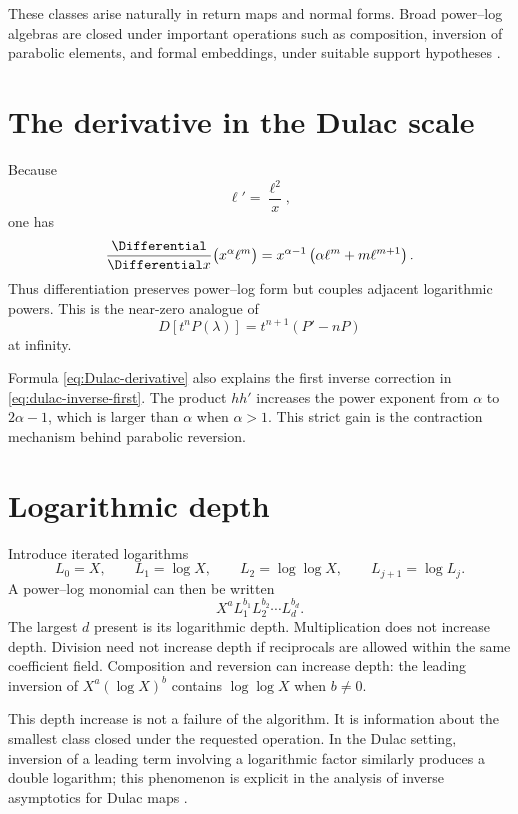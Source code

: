 \documentclass[11pt,openany]{book}
\theoremstyle{definition}
\theoremstyle{plain}
\theoremstyle{remark}
\begin{document}
These classes arise naturally in return maps and normal forms. Broad power--log algebras are closed under important operations such as composition, inversion of parabolic elements, and formal embeddings, under suitable support hypotheses \cite{mardesic-normalforms,mardesic-length,resman-dulac,peran-logtransseries}.

\section{The derivative in the Dulac scale}
Because
\[
 \ell'=\frac{\ell^2}{x},
\]
one has
\begin{equation}\label{eq:Dulac-derivative}
 \frac{\Differential}{\Differential x}\bigl(x^\alpha\ell^m\bigr)
 =x^{\alpha-1}\left(\alpha\ell^m+m\ell^{m+1}\right).
\end{equation}
Thus differentiation preserves power--log form but couples adjacent logarithmic powers. This is the near-zero analogue of
\[
 D[t^nP(\lambda)]=t^{n+1}(P'-nP)
\]
at infinity.

Formula \cref{eq:Dulac-derivative} also explains the first inverse correction in \cref{eq:dulac-inverse-first}. The product \(hh'\) increases the power exponent from \(\alpha\) to \(2\alpha-1\), which is larger than \(\alpha\) when \(\alpha>1\). This strict gain is the contraction mechanism behind parabolic reversion.

\section{Logarithmic depth}
Introduce iterated logarithms
\[
 L_0=X,
 \qquad L_1=\log X,
 \qquad L_2=\log\log X,
 \qquad L_{j+1}=\log L_j.
\]
A power--log monomial can then be written
\begin{equation}\label{eq:iterated-log-monomial}
 X^aL_1^{b_1}L_2^{b_2}\cdots L_d^{b_d}.
\end{equation}
The largest \(d\) present is its logarithmic depth. Multiplication does not increase depth. Division need not increase depth if reciprocals are allowed within the same coefficient field. Composition and reversion can increase depth: the leading inversion of \(X^a(\log X)^b\) contains \(\log\log X\) when \(b\ne0\).

This depth increase is not a failure of the algorithm. It is information about the smallest class closed under the requested operation. In the Dulac setting, inversion of a leading term involving a logarithmic factor similarly produces a double logarithm; this phenomenon is explicit in the analysis of inverse asymptotics for Dulac maps \cite{mardesic-length}.
\end{document}
